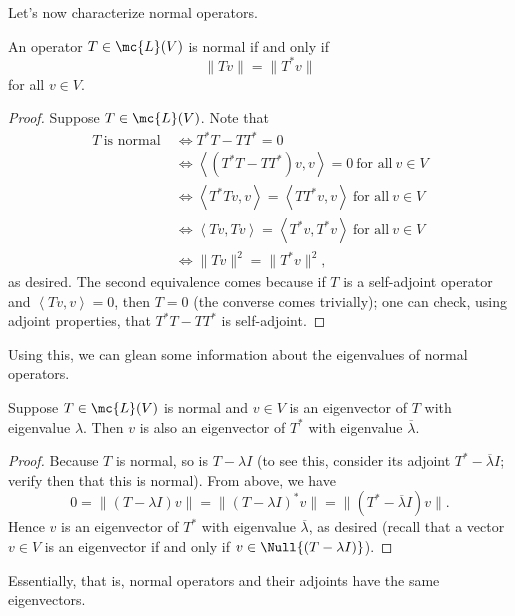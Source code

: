 \documentclass[math0540-lecture-notes.tex]{subfiles}
\begin{document}
Let's now characterize normal operators.
\begin{proposition}{}
  An operator $T\in \mc{L}(V)$ is normal if and only if \[
    \|Tv\|=\|T^*v\|
  \] for all $v\in V$.
\end{proposition}
\begin{proof}[Proof]
  Suppose $T\in \mc{L}(V)$. Note that
  \begin{align*}
    T ~\text{is normal}~&\iff T^*T-TT^*=0\\
                        &\iff \left<(T^*T-TT^*)v,v \right>=0 ~\text{for all}~v\in V\\
                        &\iff \left<T^*Tv,v \right> =\left<TT^*v,v \right> ~\text{for all}~v\in V\\
                        &\iff \left<Tv,Tv \right> =\left<T^*v,T^*v \right> ~\text{for all}~v\in V\\
                        &\iff \|Tv\|^2=\|T^*v\|^2
  ,\end{align*} as desired.
  The second equivalence comes because if $T$ is a self-adjoint operator and $\left<Tv,v \right>
  =0$, then $T=0$ (the converse comes trivially); one can check, using adjoint properties, that
  $T^*T-TT^*$ is self-adjoint.
\end{proof}
Using this, we can glean some information about the eigenvalues of normal operators.
\begin{proposition}{}
  Suppose $T\in \mc{L}(V)$ is normal and $v\in V$ is an eigenvector of $T$ with eigenvalue
  $\lambda$. Then $v$ is also an eigenvector of $T^*$ with eigenvalue $\overline{\lambda}$. 
\end{proposition}
\begin{proof}[Proof]
  Because $T$ is normal, so is $T-\lambda I$ (to see this, consider its adjoint
  $T^*-\overline{\lambda}I$; verify then that this is normal). From above, we have \[
    0 = \|(T-\lambda I)v\|=\|(T-\lambda I)^*v\|=\|(T^*-\overline{\lambda}I)v\|
  .\] Hence $v$ is an eigenvector of $T^*$ with eigenvalue $\overline{\lambda}$, as desired (recall
  that a vector $v\in V$ is an eigenvector if and only if $v\in \Null{(T-\lambda I)}$).
\end{proof}

Essentially, that is, normal operators and their adjoints have the same eigenvectors. 
\end{document}
